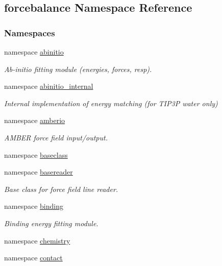\hypertarget{namespaceforcebalance}{\subsection{forcebalance Namespace Reference}
\label{namespaceforcebalance}
}
\subsubsection*{Namespaces}
\begin{DoxyCompactItemize}
\item 
namespace \hyperlink{namespaceforcebalance_1_1abinitio}{abinitio}
\begin{DoxyCompactList}\small\item\em Ab-\/initio fitting module (energies, forces, resp). \end{DoxyCompactList}\item 
namespace \hyperlink{namespaceforcebalance_1_1abinitio__internal}{abinitio\-\_\-internal}
\begin{DoxyCompactList}\small\item\em Internal implementation of energy matching (for T\-I\-P3\-P water only) \end{DoxyCompactList}\item 
namespace \hyperlink{namespaceforcebalance_1_1amberio}{amberio}
\begin{DoxyCompactList}\small\item\em A\-M\-B\-E\-R force field input/output. \end{DoxyCompactList}\item 
namespace \hyperlink{namespaceforcebalance_1_1baseclass}{baseclass}
\item 
namespace \hyperlink{namespaceforcebalance_1_1basereader}{basereader}
\begin{DoxyCompactList}\small\item\em Base class for force field line reader. \end{DoxyCompactList}\item 
namespace \hyperlink{namespaceforcebalance_1_1binding}{binding}
\begin{DoxyCompactList}\small\item\em Binding energy fitting module. \end{DoxyCompactList}\item 
namespace \hyperlink{namespaceforcebalance_1_1chemistry}{chemistry}
\item 
namespace \hyperlink{namespaceforcebalance_1_1contact}{contact}

\end{DoxyCompactItemize}

